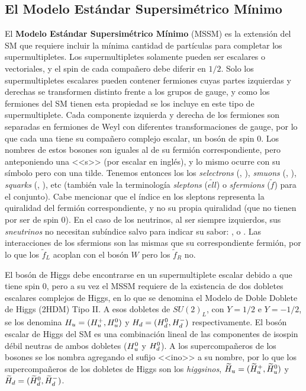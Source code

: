 \subsection{El Modelo Estándar Supersimétrico Mínimo}

El \textbf{Modelo Estándar Supersimétrico Mínimo} (MSSM) es la extensión del SM que requiere incluir la mínima cantidad de partículas para completar los supermultipletes. Los supermultipletes solamente pueden ser escalares o vectoriales, y el spin de cada compañero debe diferir en $1/2$. Solo los supermultipletes escalares pueden contener fermiones cuyas partes izquierdas y derechas se transformen distinto frente a los grupos de gauge, y como los fermiones del SM tienen esta propiedad se los incluye en este tipo de supermultiplete. Cada componente izquierda y derecha de los fermiones son separadas en fermiones de Weyl con diferentes transformaciones de gauge, por lo que cada una tiene su compañero complejo escalar, un bosón de spin 0. Los nombres de estos bosones son iguales al de su fermión correspondiente, pero anteponiendo una <<s>> (por escalar en inglés), y lo mismo ocurre con su símbolo pero con una tilde. Tenemos entonces los los \textit{selectrons} (\selL, \selR), \textit{smuons} (\smuL, \smuR), \textit{squarks} (\squarkL, \squarkR), etc (también vale la terminología \textit{sleptons} ($\tilde{ell}$) o \textit{sfermions} ($\tilde{f}$) para el conjunto). Cabe mencionar que el índice en los sleptons representa la quiralidad del fermión correspondiente, y no su propia quiralidad (que no tienen por ser de spin 0). En el caso de los neutrinos, al ser siempre izquierdos, sus \textit{sneutrinos} no necesitan subíndice salvo para indicar su sabor: \snue, \snumu o \snutau. Las interacciones de los sfermions son las mismas que su correspondiente fermión, por lo que los $\tilde{f}_L$ acoplan con el bosón $W$ pero los $\tilde{f}_R$ no.

El bosón de Higgs debe encontrarse en un supermultiplete escalar debido a que tiene spin 0, pero a su vez el MSSM requiere de la existencia de dos dobletes escalares complejos de Higgs, en lo que se denomina el Modelo de Doble Doblete de Higgs (2HDM) Tipo II. A esos dobletes de $SU(2)_L$, con $Y=1/2$ e $Y=-1/2$, se los denomina $H_u=(H_u^+, H_u^0)$ y $H_d=(H_d^0, H_d^-)$ respectivamente. El bosón escalar de Higgs del SM es una combinación lineal de las componentes de isospin débil neutras de ambos dobletes ($H_u^0$ y $H_d^0$). A los supercompañeros de los bosones se los nombra agregando el sufijo <<ino>> a su nombre, por lo que los supercompañeros de los dobletes de Higgs son los \textit{higgsinos}, $\widetilde{H}_u=(\widetilde{H}_u^+, \widetilde{H}_u^0)$ y $\widetilde{H}_d=(\widetilde{H}_d^0, \widetilde{H}_d^-)$.

